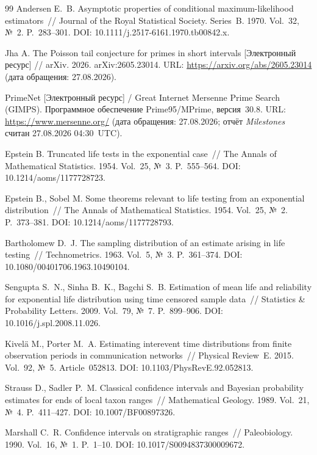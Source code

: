 \documentclass[11pt,a4paper]{article}
\theoremstyle{plain}
\theoremstyle{remark}
\begin{document}
\begin{thebibliography}{99}
 Andersen E.~B. Asymptotic properties of conditional
maximum-likelihood estimators~// Journal of the Royal Statistical Society.
Series~B. 1970. Vol.~32, №~2. P.~283--301.
DOI: 10.1111/j.2517-6161.1970.tb00842.x.

 Jha A. The Poisson tail conjecture for primes in short intervals
[Электронный ресурс] // arXiv. 2026. arXiv:2605.23014.
URL: \url{https://arxiv.org/abs/2605.23014} (дата обращения: 27.08.2026).

 PrimeNet [Электронный ресурс] / Great Internet Mersenne Prime
Search (GIMPS). Программное обеспечение Prime95/MPrime, версия~30.8.
URL: \url{https://www.mersenne.org/} (дата обращения: 27.08.2026;
отчёт \emph{Milestones} считан 27.08.2026 04:30~UTC).

 Epstein B. Truncated life tests in the exponential
case~// The Annals of Mathematical Statistics. 1954. Vol.~25, №~3. P.~555--564.
DOI: 10.1214/aoms/1177728723.

 Epstein B., Sobel M. Some theorems relevant to life
testing from an exponential distribution~// The Annals of Mathematical
Statistics. 1954. Vol.~25, №~2. P.~373--381. DOI: 10.1214/aoms/1177728793.

 Bartholomew D.~J. The sampling distribution of an
estimate arising in life testing~// Technometrics. 1963. Vol.~5, №~3.
P.~361--374. DOI: 10.1080/00401706.1963.10490104.

 Sengupta S.~N., Sinha B.~K., Bagchi S.~B. Estimation of
mean life and reliability for exponential life distribution using time censored
sample data~// Statistics \& Probability Letters. 2009. Vol.~79, №~7.
P.~899--906. DOI: 10.1016/j.spl.2008.11.026.

 Kivel\"{a} M., Porter M.~A. Estimating interevent time
distributions from finite observation periods in communication networks~//
Physical Review~E. 2015. Vol.~92, №~5. Article~052813.
DOI: 10.1103/PhysRevE.92.052813.

 Strauss D., Sadler P.~M. Classical confidence
intervals and Bayesian probability estimates for ends of local taxon ranges~//
Mathematical Geology. 1989. Vol.~21, №~4. P.~411--427. DOI: 10.1007/BF00897326.

 Marshall C.~R. Confidence intervals on stratigraphic
ranges~// Paleobiology. 1990. Vol.~16, №~1. P.~1--10.
DOI: 10.1017/S0094837300009672.


\end{thebibliography}
\end{document}
